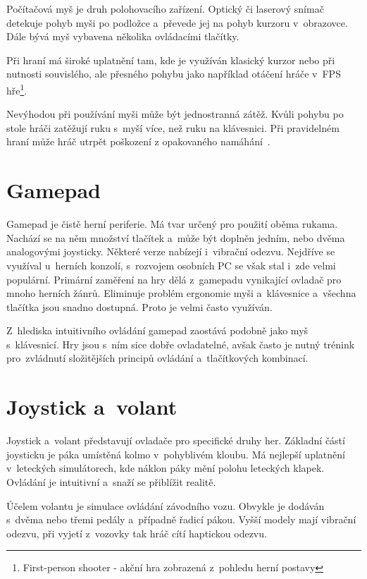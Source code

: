 \documentclass[thesis=B,czech,hidelinks]{FITthesis}[2012/06/26] %
\begin{document}
Počítačová myš je druh polohovacího zařízení. Optický či laserový snímač detekuje pohyb myši po podložce a~převede jej na pohyb kurzoru v~obrazovce. Dále bývá myš vybavena několika ovládacími tlačítky.

Při hraní má široké uplatnění tam, kde je využíván klasický kurzor nebo při nutnosti souvislého, ale přesného pohybu jako například otáčení hráče v~FPS hře\footnote{First-person shooter - akční hra zobrazená z~pohledu herní postavy}.

Nevýhodou při používání myši může být jednostranná zátěž. Kvůli pohybu po stole hráči zatěžují ruku s~myší více, než ruku na klávesnici. Při pravidelném hraní může hráč utrpět poškození z opakovaného namáhání~\cite{rsi}.

\section{Gamepad}

Gamepad je čistě herní periferie. Má tvar určený pro použití oběma rukama. Nachází se na něm množství tlačítek a~může být doplněn jedním, nebo dvěma analogovými joysticky. Některé verze nabízejí i~vibrační odezvu. Nejdříve se využíval u~herních konzolí, s~rozvojem osobních PC se však stal i~zde velmi populární. Primární zaměření na hry dělá z~gamepadu vynikající ovladač pro mnoho herních žánrů. Eliminuje problém ergonomie myši a~klávesnice a~všechna tlačítka jsou snadno dostupná. Proto je velmi často využíván.

Z~hlediska intuitivního ovládání gamepad zaostává podobně jako myš s~klávesnicí. Hry jsou s~ním sice dobře ovladatelné, avšak často je nutný trénink pro~zvládnutí složitějších principů ovládání a~tlačítkových kombinací.

\section{Joystick a~volant}

Joystick a~volant představují ovladače pro specifické druhy her. Základní částí joysticku je páka umístěná kolmo v~pohyblivém kloubu. Má nejlepší uplatnění v~leteckých simulátorech, kde náklon páky mění polohu leteckých klapek. Ovládání je intuitivní a~snaží se přiblížit realitě.

Účelem volantu je simulace ovládání závodního vozu. Obvykle je dodáván s~dvěma nebo třemi pedály a~případně řadicí pákou. Vyšší modely mají vibrační odezvu, při vyjetí z~vozovky tak hráč cítí haptickou odezvu.
\end{document}
